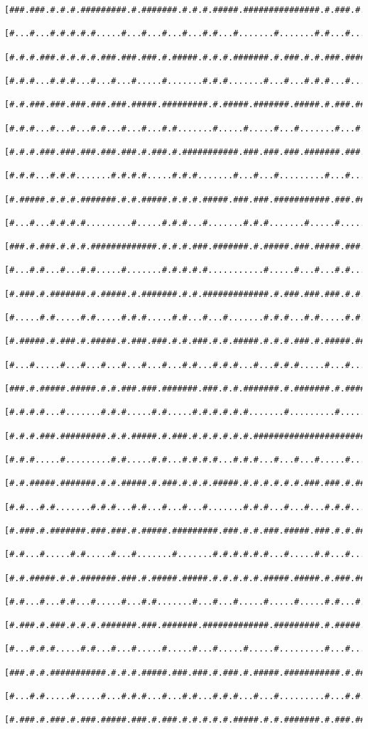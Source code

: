 \documentclass[a4paper,10pt,ngerman]{scrartcl}
\begin{document}
\begin{lstlisting}[frame=tb]
 [###.###.#.#.#.#########.#.#######.#.#.#.#####.###############.#.###.#.#.###.#.#.#]
 [#...#...#.#.#.#.#.....#...#...#...#...#.#...#.......#.......#.#...#...#.#...#.#.#]
 [#.#.#.###.#.#.#.#.###.###.###.#.#####.#.#.#.#######.#.###.#.#.###.#######.###.#.#]
 [#.#.#...#.#.#...#...#...#.....#.......#.#.#.......#...#...#.#.#...#.......#...#.#]
 [#.#.###.###.###.###.###.#####.#########.#.#####.#######.#####.#.###.#######.###.#]
 [#.#.#...#...#...#.#...#...#...#.#.......#.....#.....#...#.......#...#.#.....#...#]
 [#.#.#.###.###.###.###.###.#.###.#.###########.###.###.###.#######.###.#.#####.###]
 [#.#.#...#.#.#.......#.#.#.#.....#.#.#.......#...#...#.........#...#...#.#.......#]
 [#.#####.#.#.#.#######.#.#.#####.#.#.#.#####.###.###.###########.###.###.#.#####.#]
 [#...#...#.#.#.#.........#.....#.#.#...#.......#.#.#.......#.....#.....#.#.....#.#]
 [###.#.###.#.#.#.#############.#.#.#.###.#######.#.#####.###.#####.###.#.###.###.#]
 [#...#.#...#...#.#.....#.......#.#.#.#.#...........#.....#...#...#.#...#.#...#...#]
 [#.###.#.#######.#.#####.#.#######.#.#.#############.#.###.###.###.#.#.#.#####.###]
 [#.....#.#.....#.#.....#.#.#.....#.#...#...#.......#.#.#...#.#.....#.#.#.#...#...#]
 [#.#####.#.###.#.#####.#.###.###.#.#.###.#.#.#####.#.#.#.###.#.#####.###.#.#.###.#]
 [#...#.....#...#...#...#...#...#...#.#...#.#.#...#...#.#.#.....#...#.......#...#.#]
 [###.#.#####.#####.#.#.###.###.#######.###.#.#.#######.#.#######.#.###########.#.#]
 [#.#.#.#...#.......#.#.#.....#.#.....#.#.#.#.#.#.......#.........#.......#...#.#.#]
 [#.#.#.###.#########.#.#.#####.#.###.#.#.#.#.#.#.#######################.#.#.#.#.#]
 [#.#.#.....#.........#.#.....#.#...#.#.#.#...#.#.#...#...#...#.....#.....#.#.#.#.#]
 [#.#.#####.#######.#.#.#####.#.###.#.#.#.#####.#.#.#.#.#.#.###.###.#.#####.###.#.#]
 [#.#...#.#.......#.#.#...#.#...#...#...#.......#.#.#...#...#...#.#.#.....#...#.#.#]
 [#.###.#.#######.###.###.#.#####.#########.###.#.#.###.#####.###.#.#.###.#.#.#.#.#]
 [#.#...#.....#.#.....#...#.......#.......#.#.#.#.#.#...#.....#.#...#...#.#.#.#...#]
 [#.#.#####.#.#.#######.###.#.#####.#####.#.#.#.#.#.#####.#####.#.###.###.###.###.#]
 [#.#...#...#.#...#.....#...#.#.......#...#...#.....#.....#.....#.#...#...#...#...#]
 [#.###.#.###.#.#.#.#######.###.#######.#############.#########.#.#####.###.#.#.###]
 [#...#.#.#.....#.#...#...#.....#.....#...#.....#.....#.........#...#...#...#.#...#]
 [###.#.#.###########.#.#.#.#####.###.###.#.###.#.#####.###########.#.###.#######.#]
 [#...#.#.....#.....#...#.#.#...#...#.#...#.#.#...#...#.........#...#.#...........#]
 [#.###.#.###.#.###.#####.###.#.###.#.#.#.#.#.#####.#.#.#######.#.###.#########.###]

\end{lstlisting}
\end{document}
